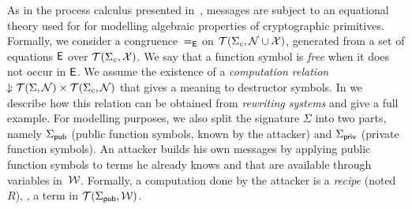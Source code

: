 As in the process calculus presented in~\cite{BlanchetAbadiFournetJLAP08}, 
messages are subject to an equational theory
used for
for modelling algebraic properties of cryptographic primitives.
Formally, we consider a congruence~$=_{\mathsf{E}}$ on $\mathcal{T}(\Sigma_c,\mathcal{N} \cup \mathcal{X})$,
generated from a set of equations $\mathsf{E}$ over $\mathcal{T}(\Sigma_c,\mathcal{X})$.
We say that a function symbol is {\em free} when it does not occur
in $\mathsf{E}$.
We assume the existence of a \emph{computation relation}
$\!\downarrow\! : \mathcal{T}(\Sigma,\mathcal{N})\times\mathcal{T}(\Sigma_c,\mathcal{N})$
that gives a meaning to destructor symbols.
In 
we describe how this relation can be obtained from \emph{rewriting systems} and
give a full example.
%
For modelling purposes, we also split the signature $\Sigma$ into two
parts, namely $\Sigma_{\mathsf{pub}}$ (public function symbols, known
by the attacker) and $\Sigma_{\mathsf{priv}}$ (private function symbols).
An attacker builds his own messages by applying public function symbols to
terms he already knows and that are available through variables
in~$\mathcal{W}$. Formally, a computation done by the attacker is a
\emph{recipe} (noted $R$), \ie, a term in $\mathcal{T}(\Sigma_{\mathsf{pub}},\mathcal{W})$.
%

